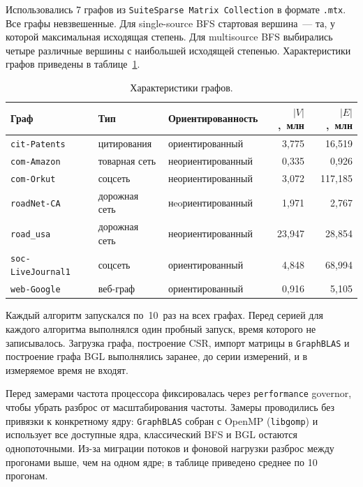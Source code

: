 \documentclass[a4paper]{article}
\begin{document}
Использовались 7 графов из \texttt{SuiteSparse Matrix Collection} в формате \texttt{.mtx}. Все графы невзвешенные. Для single-source BFS стартовая вершина~--- та, у которой максимальная исходящая степень. Для multisource BFS выбирались четыре различные вершины с наибольшей исходящей степенью. Характеристики графов приведены в таблице~\ref{tab:graphs}.

\begin{table}[h!]
\centering
\scriptsize
\setlength{\tabcolsep}{4pt}
\begin{tabular}{lllrr}
\toprule
Граф & Тип & Ориентированность & $|V|$,~млн & $|E|$,~млн \\
\midrule
\texttt{cit-Patents}      & цитирования   & ориентированный   & 3,775  & 16,519  \\
\texttt{com-Amazon}       & товарная сеть & неориентированный & 0,335  & 0,926   \\
\texttt{com-Orkut}        & соцсеть       & неориентированный & 3,072  & 117,185 \\
\texttt{roadNet-CA}       & дорожная сеть & нeoриентированный & 1,971  & 2,767   \\
\texttt{road\_usa}        & дорожная сеть & неориентированный & 23,947 & 28,854  \\
\texttt{soc-LiveJournal1} & соцсеть       & ориентированный   & 4,848  & 68,994  \\
\texttt{web-Google}       & веб-граф      & ориентированный   & 0,916  & 5,105   \\
\bottomrule
\end{tabular}
\caption{Характеристики графов.}
\label{tab:graphs}
\end{table}

Каждый алгоритм запускался по~10~раз на всех графах. Перед серией для каждого алгоритма выполнялся один пробный запуск, время которого не записывалось. Загрузка графа, построение CSR, импорт матрицы в \texttt{GraphBLAS} и построение графа BGL выполнялись заранее, до серии измерений, и в измеряемое время не входят.

Перед замерами частота процессора фиксировалась через \texttt{performance} governor, чтобы убрать разброс от масштабирования частоты. Замеры проводились без привязки к конкретному ядру: \texttt{GraphBLAS} собран с OpenMP (\texttt{libgomp}) и использует все доступные ядра, классический BFS и BGL остаются однопоточными. Из-за миграции потоков и фоновой нагрузки разброс между прогонами выше, чем на одном ядре; в таблице приведено среднее по 10 прогонам.
\end{document}
